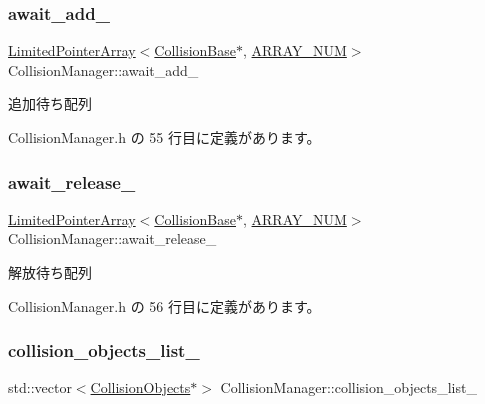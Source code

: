 \subsubsection{\texorpdfstring{await\+\_\+add\+\_\+}{await\_add\_}}
{\footnotesize\ttfamily \mbox{\hyperlink{class_limited_pointer_array}{Limited\+Pointer\+Array}}$<$\mbox{\hyperlink{class_collision_base}{Collision\+Base}}$\ast$, \mbox{\hyperlink{class_collision_manager_addbc64e1fa0b01f3be07c897887f44ec}{A\+R\+R\+A\+Y\+\_\+\+N\+UM}}$>$ Collision\+Manager\+::await\+\_\+add\+\_\+\hspace{0.3cm}{\ttfamily [private]}}



追加待ち配列 



 Collision\+Manager.\+h の 55 行目に定義があります。

\mbox{\label{class_collision_manager_a077c3b33557c56afef69c69698fc76e0}} 
\subsubsection{\texorpdfstring{await\+\_\+release\+\_\+}{await\_release\_}}
{\footnotesize\ttfamily \mbox{\hyperlink{class_limited_pointer_array}{Limited\+Pointer\+Array}}$<$\mbox{\hyperlink{class_collision_base}{Collision\+Base}}$\ast$, \mbox{\hyperlink{class_collision_manager_addbc64e1fa0b01f3be07c897887f44ec}{A\+R\+R\+A\+Y\+\_\+\+N\+UM}}$>$ Collision\+Manager\+::await\+\_\+release\+\_\+\hspace{0.3cm}{\ttfamily [private]}}



解放待ち配列 



 Collision\+Manager.\+h の 56 行目に定義があります。

\mbox{\label{class_collision_manager_a9e3350981cdf6a6ecd6b5151bedb72ef}} 
\subsubsection{\texorpdfstring{collision\+\_\+objects\+\_\+list\+\_\+}{collision\_objects\_list\_}}
{\footnotesize\ttfamily std\+::vector$<$\mbox{\hyperlink{class_collision_objects}{Collision\+Objects}}$\ast$$>$ Collision\+Manager\+::collision\+\_\+objects\+\_\+list\+\_\+\hspace{0.3cm}{\ttfamily [private]}}



